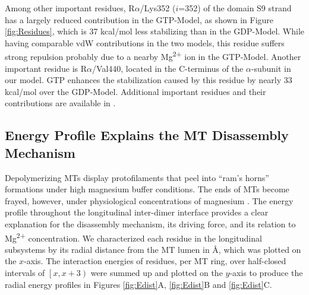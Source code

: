 \documentclass[11pt]{report}
\begin{document}
Among other important residues, R$\alpha$/Lys352 ($i$=352)
of the domain S9 strand has a largely reduced contribution in the
GTP-Model, as shown in Figure \ref{fig:Residues}, which is 37 kcal/mol
less stabilizing than in the GDP-Model. While having 
comparable vdW contributions in the two models, this residue
suffers strong repulsion probably
due to a nearby Mg\textsuperscript{2+} ion in the GTP-Model.
Another important residue is R$\alpha$/Val440, located in the C-terminus
of the $\alpha$-subunit in our model. GTP enhances the stabilization caused by
this residue by nearly
33 kcal/mol over the GDP-Model. Additional important 
residues and their contributions 
are
available in \cite{Ayoub2015}.

\subsection{Energy Profile Explains the MT Disassembly Mechanism}
Depolymerizing MTs display protofilaments that
peel into ``ram's horns'' formations under high magnesium
buffer conditions. The ends of MTs become frayed, however,
under physiological concentrations of magnesium \cite{Mandelkow1991}.
The energy profile throughout the longitudinal inter-dimer interface provides
a clear explanation for the disassembly mechanism, its driving force,
and its relation to Mg\textsuperscript{2+} concentration.
We characterized each residue in the longitudinal 
subsystems by its radial distance from the MT lumen in \AA, which 
was plotted on the $x$-axis. The interaction 
energies of residues, per MT ring, over half-closed intervals of $\left[x,x+3 \right)$ were summed up and
plotted on the $y$-axis to produce the radial energy profiles 
in Figures \ref{fig:Edist}A,
\ref{fig:Edist}B and \ref{fig:Edist}C. 
\end{document}
